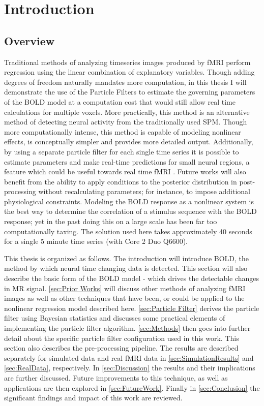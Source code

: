 \chapter{Introduction}
\section{Overview}
Traditional methods of analyzing timeseries images produced by 
\ac{fMRI} perform regression using the linear combination of explanatory variables. 
Though adding degrees of freedom naturally mandates more computation,
in this thesis I will demonstrate the use of the Particle Filters to 
estimate the governing parameters of the \ac{BOLD} model at a computation cost 
that would still allow real time calculations for multiple voxels.
More practically, this method is an alternative
method of detecting neural activity from the traditionally
used \ac{SPM}. Though more computationally intense,
this method is capable of modeling nonlinear effects, is conceptually simpler
and provides more detailed output. Additionally,
by using a separate particle filter for each single time series it 
is possible to estimate parameters and make real-time predictions
for small neural regions, a feature which could be useful towards real time \ac{fMRI}
\cite{DeCharms2005}. Future works will also benefit from the ability to 
apply conditions to the posterior distribution in post-processing without
recalculating parameters; for instance, to impose additional 
physiological
constraints. Modeling the \ac{BOLD} response 
as a nonlinear system is the
best way to determine the correlation of a stimulus sequence with the \ac{BOLD}
response; yet in the past doing this on a large scale has been far too
computationally taxing. The solution used here takes approximately 40 seconds
for a single 5 minute time series (with Core 2 Duo Q6600). 

This thesis is organized as follows. The introduction will introduce
\ac{BOLD}, the method by which neural time changing data is detected. This section
will also describe the basic form of the \ac{BOLD} model - which drives the 
detectable changes in \ac{MR} signal. \autoref{sec:Prior Works} will discuss other
methods of analyzing \ac{fMRI} images as well as other techniques that have
been, or could be applied to the nonlinear regression model described here. 
\autoref{sec:Particle Filter} derives the particle filter using Bayesian 
statistics and discusses some practical elements of implementing the 
particle filter algorithm. \autoref{sec:Methods} then goes into further
detail about the specific particle filter configuration used in this work.
This section also describes the pre-processing pipeline. 
The results are described separately for simulated data
and real \ac{fMRI} data in \autoref{sec:SimulationResults} and \autoref{sec:RealData},
respectively. In \autoref{sec:Discussion} the results and their implications
are further discussed. Future improvements to this technique, as well
as applications are then explored in \autoref{sec:FutureWork}.
Finally in \autoref{sec:Conclusion} the significant findings and 
impact of this work are reviewed. 

